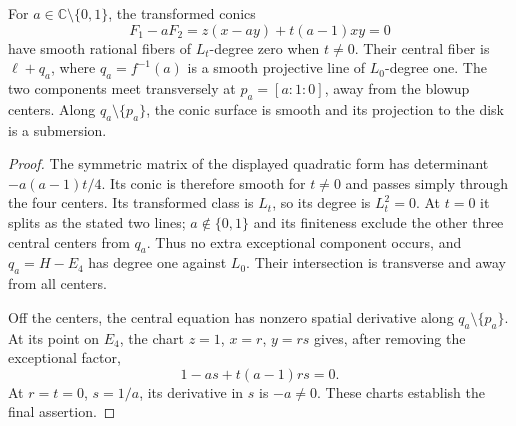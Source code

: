 \begin{lemma}\label{lem:four-point-variable-conics}
For $a\in\mathbb C\setminus\{0,1\}$, the transformed conics
\[
 F_1-aF_2=z(x-ay)+t(a-1)xy=0
\]
have smooth rational fibers of $L_t$-degree zero when $t\ne0$. Their central fiber is $\ell+q_a$, where $q_a=f^{-1}(a)$ is a smooth projective line of $L_0$-degree one. The two components meet transversely at $p_a=[a:1:0]$, away from the blowup centers. Along $q_a\setminus\{p_a\}$, the conic surface is smooth and its projection to the disk is a submersion.
\end{lemma}
\begin{proof}
The symmetric matrix of the displayed quadratic form has determinant $-a(a-1)t/4$. Its conic is therefore smooth for $t\ne0$ and passes simply through the four centers. Its transformed class is $L_t$, so its degree is $L_t^2=0$. At $t=0$ it splits as the stated two lines; $a\notin\{0,1\}$ and its finiteness exclude the other three central centers from $q_a$. Thus no extra exceptional component occurs, and $q_a=H-E_4$ has degree one against $L_0$. Their intersection is transverse and away from all centers.

Off the centers, the central equation has nonzero spatial derivative along $q_a\setminus\{p_a\}$. At its point on $E_4$, the chart $z=1$, $x=r$, $y=rs$ gives, after removing the exceptional factor,
\[
 1-as+t(a-1)rs=0.
\]
At $r=t=0$, $s=1/a$, its derivative in $s$ is $-a\ne0$. These charts establish the final assertion.
\end{proof}

